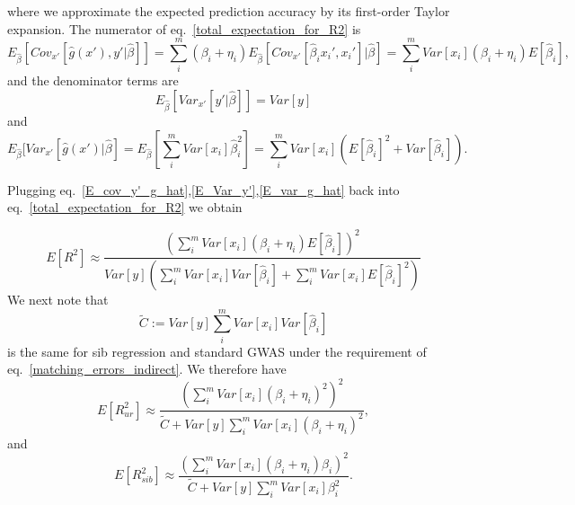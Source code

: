 \documentclass[hidelinks, 12pt]{article}
\begin{document}
where we approximate the expected prediction accuracy by its first-order Taylor expansion.  The numerator  of eq.~\ref{total_expectation_for_R2} is 
\begin{equation}
\label{E_cov_y'_g_hat}
E_{\hat{\beta}}[Cov_{x'}[\hat{g}(x'),y'|\hat{\beta}]]=\sum_i^m(\beta_i+\eta_i)E_{\hat{\beta}}[Cov_{x'}[\hat{\beta}_ix_i',x_i']|\hat{\beta}] = \sum_i^m Var[x_i](\beta_i+\eta_i)E[\hat{\beta}_i],
\end{equation}
and the denominator terms are 
\begin{equation}
\label{E_Var_y'}
E_{\hat{\beta}}[Var_{x'}[y'|\hat{\beta}]] = Var[y]
\end{equation}
and
\begin{equation}
\label{E_var_g_hat}
E_{\hat{\beta}}[Var_{x'}[\hat{g}(x')|\hat{\beta}] = E_{\hat{\beta}}[\sum_i^mVar[x_i]\hat{\beta}_i^2] =
\sum_i^mVar[x_i](E[\hat{\beta}_i]^2+Var[\hat{\beta}_i]).
\end{equation}

Plugging eq.~\ref{E_cov_y'_g_hat},\ref{E_Var_y'},\ref{E_var_g_hat} back into eq.~\ref{total_expectation_for_R2} we obtain

\begin{equation}
\label{R_indirect_general_form}
E[R^2] \approx \frac{(\sum_i^mVar[x_i](\beta_i+\eta_i)E[\hat{\beta}_i])^2}{Var[y](\sum_i^mVar[x_i]Var[\hat{\beta}_i]+\sum_i^mVar[x_i]E[\hat{\beta}_i]^2)}
\end{equation}
We next note that 
$$\tilde{C}:=Var[y]\sum_i^m Var[x_i] Var[\hat{\beta}_i]$$
is the same for sib regression and standard GWAS under the requirement of eq.~\ref{matching_errors_indirect}.  We therefore have 
\begin{equation}
\label{R_indirect_unrelated_longform}
E[R_{ur}^2] \approx \frac{(\sum_i^mVar[x_i](\beta_i+\eta_i)^2)^2}{\tilde{C}+ Var[y]\sum_i^mVar[x_i](\beta_i+\eta_i)^2},
\end{equation}
and
\begin{equation}
\label{R_indirect_sibs_longform}
E[R_{sib}^2] \approx \frac{(\sum_i^mVar[x_i](\beta_i+\eta_i)\beta_i)^2}{\tilde{C}+ Var[y]\sum_i^mVar[x_i]\beta_i^2}.
\end{equation}
\end{document}

